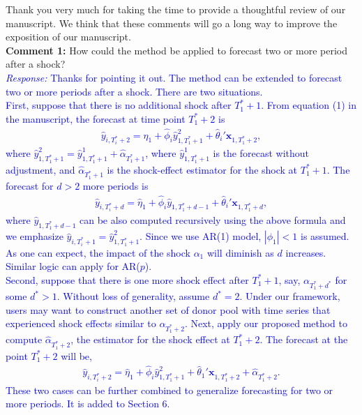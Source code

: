 \documentclass[12pt]{article}
\newcommand{\response}[1]{\noindent \textcolor{blue}{\emph{Response:} #1}}
\begin{document}
Thank you very much for taking the time to provide a thoughtful review of our manuscript. We think that these comments will go a long way to improve the exposition of our manuscript. \\


{\bf  Comment 1:} How could the method be applied to forecast two or more period after a shock? \\

\response{Thanks for pointing it out. The method can be extended to forecast two or more periods after a shock. There are two situations.  \\

First, suppose that there is no additional shock after $T_1^* + 1$. From equation (1) in the manuscript, the forecast at time point $T_1^*+2$ is
\begin{align*}
 \hat{y}_{i, T_i^* + 2} = \hat{\eta}_1 + \hat{\phi}_i \hat{y}_{1, T_1^*+1}^{2} + \hat{\theta}_i'\mathbf{x}_{1, T_1^*+2}, \tag{*}
\end{align*}
where $\hat{y}_{1, T_1^*+1}^{2}=\hat{y}_{1, T_1^*+1}^{1} + \hat{\alpha}_{T_1^* + 1}$, where $\hat{y}_{1, T_1^*+1}^{1}$ is the forecast without adjustment, and  $\hat{\alpha}_{T_1^* + 1}$ is the shock-effect estimator for the shock at $T_1^*+1$. The forecast for $d>2$ more periods is
\begin{align*}
 \hat{y}_{i, T_i^* + d} = \hat{\eta}_1 + \hat{\phi}_i \hat{y}_{1, T_1^*+d-1}+ \hat{\theta}_i'\mathbf{x}_{1, T_1^*+d},
\end{align*}
where $\hat{y}_{1, T_1^*+d-1}$ can be also computed recursively using the above formula and we  emphasize  $ \hat{y}_{i, T_i^* + 1}=\hat{y}_{1, T_1^*+1}^{2}$. Since we use AR(1) model, $|\phi_1 |< 1$ is assumed.  As one can expect, the impact of the shock  $\alpha_1$ will diminish as $d$ increases. Similar logic can apply for AR($p$). \\

Second, suppose that  there is one more shock effect after $T_1^*+1$, say, $\alpha_{T_1^* + d^*}$ for some $d^* > 1$. Without loss of generality, assume $d^* = 2$. Under our framework, users may want to construct another set of donor pool with time series that experienced shock effects similar to $\alpha_{T_1^* + 2}$. Next,  apply our proposed method to compute $\hat{\alpha}_{T_1^* + 2}$, the estimator for the shock effect at $T_1^* +2$. The forecast at the point $T_1^* + 2$ will be,  
\begin{align*}
 \hat{y}_{i, T_i^* + 2} = \hat{\eta}_1 + \hat{\phi}_i \hat{y}_{1, T_1^*+1}^{2} + \hat{\theta}_1'\mathbf{x}_{1, T_1^*+2} + \hat{\alpha}_{T_1^* + 2}.
\end{align*}
These two cases can be further combined to generalize forecasting for two or more periods. It is added to Section 6.\\
}
\end{document}
